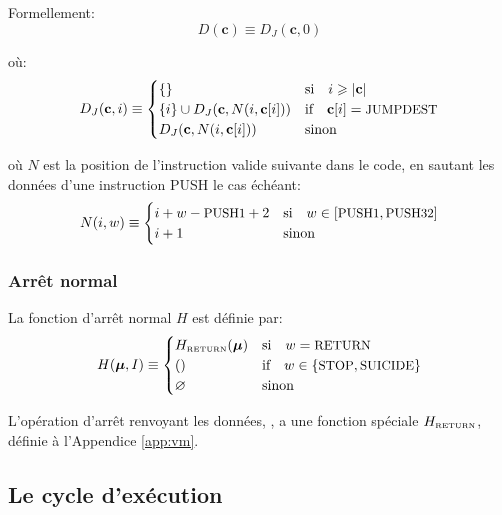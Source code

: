 \documentclass[9pt,oneside]{amsart}
\begin{document}
\begin{multicols}{2}
Formellement:
\begin{equation}
D(\mathbf{c}) \equiv D_J(\mathbf{c}, 0)
\end{equation}

où:
\begin{equation}
D_J(\mathbf{c}, i) \equiv \begin{cases}
\{\} & \text{si} \quad i \geqslant |\mathbf{c}|  \\
\{ i \} \cup D_J(\mathbf{c}, N(i, \mathbf{c}[i])) & \text{if} \quad \mathbf{c}[i] = \text{\small JUMPDEST} \\
D_J(\mathbf{c}, N(i, \mathbf{c}[i])) & \text{sinon} \\
\end{cases}
\end{equation}

où $N$ est la position de l'instruction valide suivante dans le code, en sautant les données d'une instruction {\small PUSH} le cas échéant:
\begin{equation}
N(i, w) \equiv \begin{cases}
i + w - \text{\small PUSH1} + 2 & \text{si} \quad w \in [\text{\small PUSH1}, \text{\small PUSH32}] \\
i + 1 & \text{sinon} \end{cases}
\end{equation}

\subsubsection{Arrêt normal}

La fonction d'arrêt normal $H$ est définie par:
\begin{equation}
H(\boldsymbol{\mu}, I) \equiv \begin{cases}
H_{\text{\tiny RETURN}}(\boldsymbol{\mu}) & \text{si} \quad w = \text{\small RETURN} \\
() & \text{if} \quad w \in \{ \text{\small STOP}, \text{\small SUICIDE} \} \\
\varnothing & \text{sinon}
\end{cases}
\end{equation}

L'opération d'arrêt renvoyant les données, , a une fonction spéciale $H_{\text{\tiny RETURN}}$, définie à l'Appendice \ref{app:vm}.

\subsection{Le cycle d'exécution}


\end{multicols}
\end{document}
